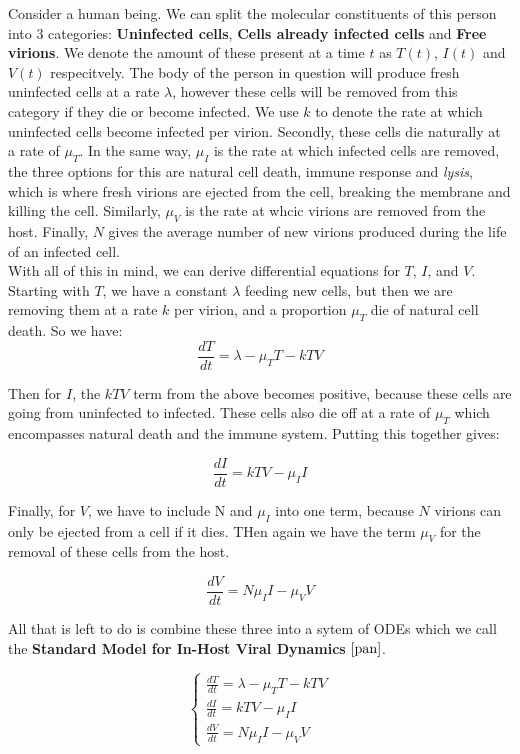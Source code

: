 Consider a human being. We can split the molecular constituents of this person into 3 categories: \textbf{Uninfected cells}, \textbf{Cells already infected cells} and \textbf{Free virions}. We denote the amount of these present at a time $t$ as  $T(t)$,  $I(t)$ and  $V(t)$ respecitvely.
The body of the person in question will produce fresh uninfected cells at a rate $\lambda$, however these cells will be removed from this category if they die or become infected. We use  $k$ to denote the rate at which uninfected cells become infected per virion. Secondly, these cells die naturally at a rate of  $\mu_T$. In the same way, $\mu_I$ is the rate at which infected cells are removed, the three options for this are natural cell death, immune response and \textit{lysis}, which is where fresh virions are ejected from the cell, breaking the membrane and killing the cell. Similarly, $\mu_V$ is the rate at whcic virions are removed from the host. Finally, $N$ gives the average number of new virions produced during the life of an infected cell. \\

With all of this in mind, we can derive differential equations for $T$,  $I$, and  $V$. Starting with $T$, we have a constant  $\lambda$ feeding new cells, but then we are removing them at a rate $k$ per virion, and a proportion $\mu_T$ die of natural cell death. So we have: \\

\[
    \frac{dT}{dt} = \lambda - \mu_TT - kTV    
\] 

Then for $I$, the $kTV$ term from the above becomes positive, because these cells are going from uninfected to infected. These cells also die off at a rate of $\mu_T$ which encompasses natural death and the immune system. Putting this together gives:

\[
    \frac{dI}{dt} = kTV - \mu_II    
\] 

Finally, for $V$, we have to include N and $\mu_I$ into one term, because  $N$ virions can only be ejected from a cell if it dies. THen again we have the term  $\mu_V$ for the removal of these cells from the host.

\[
    \frac{dV}{dt} = N\mu_II - \mu_VV
\] 

All that is left to do is combine these three into a sytem of ODEs which we call the \textbf{Standard Model for In-Host Viral Dynamics} $\cite{pan}$.

\begin{equation}
    \begin{cases}
        \frac{dT}{dt} = \lambda - \mu_TT - kTV \\
        \frac{dI}{dt} = kTV - \mu_II \\
        \frac{dV}{dt} = N\mu_II - \mu_VV
    \end{cases}
\end{equation}

